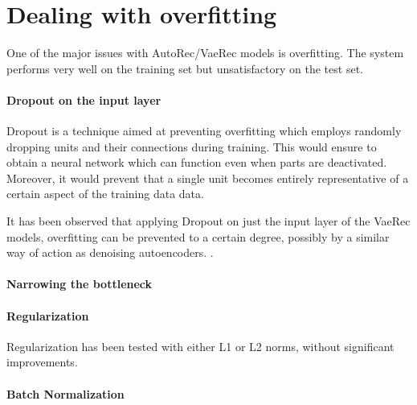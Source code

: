 \section{Dealing with overfitting}

One of the major issues with AutoRec/VaeRec models
is overfitting. The system performs very well on the training
set but unsatisfactory on the test set.

\paragraph{Dropout on the input layer}
Dropout \cite{Srivastava2014}
is a technique aimed at preventing overfitting
which employs randomly dropping units
and their connections
during training.
This would ensure to obtain a neural network
which can function even when parts are deactivated.
Moreover, it would prevent that a single unit becomes
entirely representative of a certain aspect of the training data
data.

It has been observed that applying Dropout on just the input layer
of the VaeRec models,
overfitting can be prevented to a certain degree,
possibly by a similar way of action as denoising autoencoders.
\cite{Vincent2010}.

\paragraph{Narrowing the bottleneck}
\paragraph{Regularization}
Regularization has been tested with either L1 or L2 norms,
without significant improvements.
\paragraph{Batch Normalization}
